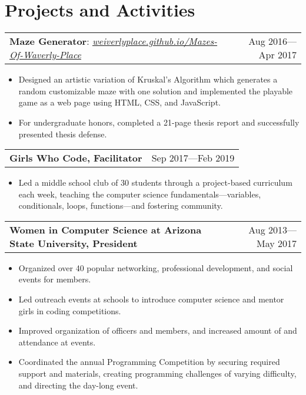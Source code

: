 \documentclass[letterpaper,11pt]{article}
\makeatletter
\newcommand{\resumeItem}[1]{
	\item{
		#1
	}
}
\newcommand{\resumeSubItem}[2]{
	\vspace{-3pt}\item
	\begin{tabular*}{0.97\textwidth}{l@{\extracolsep{\fill}}r}
	\textbf{#1} & {#2} \\
	\end{tabular*}\vspace{-5pt}
}
\newcommand{\resumeSubItemWithLink}[4]{
	\vspace{-3pt}\item
	\begin{tabular*}{0.97\textwidth}{l@{\extracolsep{\fill}}r}
		\textbf{#1}: \textit{\href{#2}{#3}} & {#4} \\
	\end{tabular*}\vspace{-7pt}
}
\newcommand{\resumeSubHeadingListStart}{\begin{description}[leftmargin=*]}
\newcommand{\resumeSubHeadingListEnd}{\end{description}}
\newcommand{\resumeItemListStart}{\begin{itemize}[leftmargin=*,rightmargin=\dimexpr\linewidth-0.92\textwidth-\leftmargin\relax]}
\newcommand{\resumeItemListEnd}{\end{itemize}\vspace{-5pt}}
\makeatother
\begin{document}
	\section{Projects and Activities}
	\resumeSubHeadingListStart
	\resumeSubItemWithLink
	{Maze Generator}{https://weiverlyplace.github.io/Mazes-Of-Waverly-Place}{weiverlyplace.github.io/Mazes-Of-Waverly-Place}{Aug 2016---Apr 2017}
	\resumeItemListStart
	\resumeItem
	{Designed an artistic variation of Kruskal's Algorithm which generates a random customizable maze with one solution and implemented the playable game as a web page using HTML, CSS, and JavaScript.}
	\resumeItem
	{For undergraduate honors, completed a 21-page thesis report and successfully presented thesis defense.}
	\resumeItemListEnd
	\resumeSubItem
	{Girls Who Code, Facilitator}{Sep 2017---Feb 2019}
	\resumeItemListStart
	\resumeItem
	{Led a middle school club of 30 students through a project-based curriculum each week, teaching the computer science fundamentals---variables, conditionals, loops, functions---and fostering community.}
	\resumeItemListEnd
	\resumeSubItem
	{Women in Computer Science at Arizona State University, President}{Aug 2013---May 2017}
	\resumeItemListStart
	\resumeItem{Organized over 40 popular networking, professional development, and social events for members.}
	\resumeItem{Led outreach events at schools to introduce computer science and mentor girls in coding competitions.}
	\resumeItem{Improved organization of officers and members, and increased amount of and attendance at events.}
	\resumeItem{Coordinated the annual Programming Competition by securing required support and materials, creating programming challenges of varying difficulty, and directing the day-long event.}
	\resumeItemListEnd
	\resumeSubHeadingListEnd
	
\end{document}
